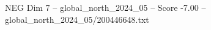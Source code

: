\begin{textsample}{NEG Dim 7 – global\_north\_2024\_05 – Score -7.00 – global\_north\_2024\_05/200446648.txt}
\end{textsample}

